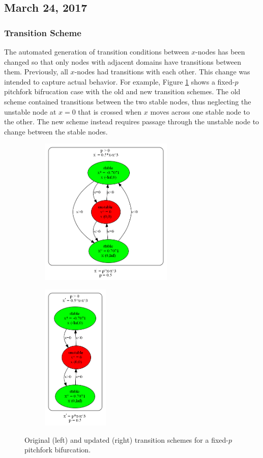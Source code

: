 \documentclass[12pt]{article}
\begin{document}
\subsection{March 24, 2017}
\subsubsection{Transition Scheme}
The automated generation of transition conditions between $x$-nodes has been changed so that only nodes with adjacent domains have transitions between them. Previously, all $x$-nodes had transitions with each other. This change was intended to capture actual behavior. For example, Figure \ref{mar24_graph_pf} shows a fixed-$p$ pitchfork bifrucation case with the old and new transition schemes. The old scheme contained transitions between the two stable nodes, thus neglecting the unstable node at $x=0$ that is crossed when $x$ moves across one stable node to the other. The new scheme instead requires passage through the unstable node to change between the stable nodes. 

\begin{figure}[H]
\centering
\begin{subfigure}[b]{0.4\textwidth}
	\centering
	\includegraphics[width=2.5in]{mar24_graph_pf1.png}
\end{subfigure}
\qquad 
\begin{subfigure}[b]{0.4\textwidth}
	\centering
	\includegraphics[width=1.25in]{mar24_graph_pf2.png}
\end{subfigure}
\caption{Original (left) and updated (right) transition schemes for a fixed-$p$ pitchfork bifurcation.}
\label{mar24_graph_pf}
\end{figure}
\end{document}
